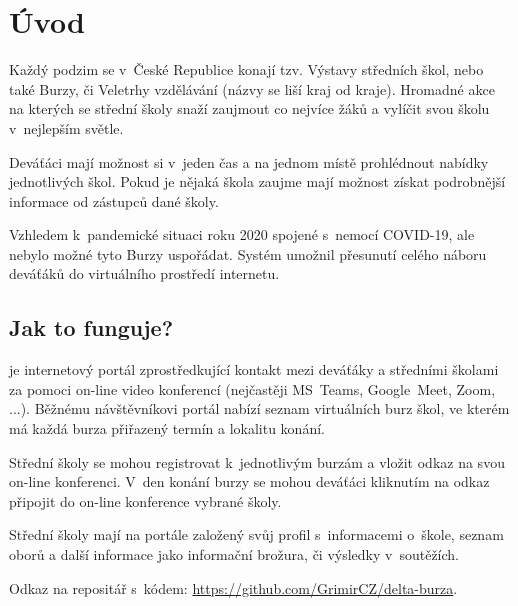 \chapter*{Úvod}

Každý podzim se v~České Republice konají tzv. Výstavy středních škol, nebo také Burzy, či Veletrhy vzdělávání (názvy se liší kraj od kraje). Hromadné akce na kterých se střední školy snaží zaujmout co nejvíce žáků  a vylíčit svou školu v~nejlepším světle.

Deváťáci mají možnost si v~jeden čas a na jednom místě prohlédnout nabídky jednotlivých škol. Pokud je nějaká škola zaujme mají možnost získat podrobnější informace od zástupců dané školy. 

Vzhledem k~pandemické situaci roku 2020 spojené s~nemocí COVID-19, ale nebylo možné tyto Burzy uspořádat. Systém \bso{} umožnil přesunutí celého náboru deváťáků do virtuálního prostředí internetu.

\section*{Jak to funguje?}
\bso{} je internetový portál zprostředkující kontakt mezi deváťáky a středními školami za pomoci on-line video konferencí (nejčastěji MS~Teams\cite{ms-teams}, Google~Meet\cite{google-meet}, Zoom\cite{zoom}, ...). Běžnému návštěvníkovi portál nabízí seznam virtuálních burz škol, ve kterém má každá burza přiřazený termín a lokalitu konání.

Střední školy se mohou registrovat k~jednotlivým burzám a vložit odkaz na svou on-line konferenci. V~den konání burzy se mohou deváťáci kliknutím na odkaz připojit do on-line konference vybrané školy.

Střední školy mají na portále založený svůj profil s~informacemi o~škole, seznam oborů a další informace jako informační brožura, či výsledky v~soutěžích.

Odkaz na repositář s~kódem: \href{https://github.com/GrimirCZ/delta-burza}{https://github.com/GrimirCZ/delta-burza}.

\pagebreak

